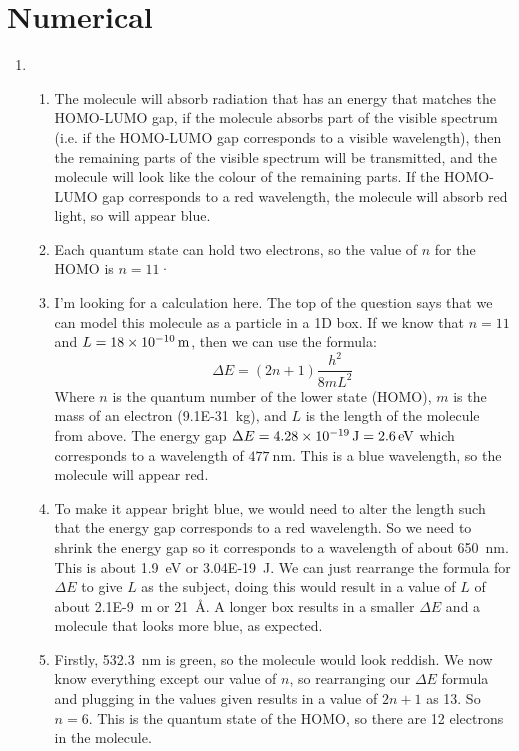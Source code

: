 \documentclass{memoir}[11pt,oneside,a4paper,openany]
\begin{document}
\section*{Numerical}
\begin{enumerate}
	\item 
		\begin{enumerate}
			\item The molecule will absorb radiation that has an energy that matches the HOMO-LUMO gap, if the molecule absorbs part of the visible spectrum (i.e. if the HOMO-LUMO gap corresponds to a visible wavelength), then the remaining parts of the visible spectrum will be transmitted, and the molecule will look like the colour of the remaining parts. If the HOMO-LUMO gap corresponds to a red wavelength, the molecule will absorb red light, so will appear blue.
			\item Each quantum state can hold two electrons, so the value of $n$ for the HOMO is $n=11$·
			\item I'm looking for a calculation here. The top of the question says that we can model this molecule as a particle in a 1D box. If we know that $n=11$ and $L=\SI{18E-10}{m}$, then we can use the formula:
				\begin{equation}
					\Delta E = (2n+1)\frac{h^2}{8mL^2}
				\end{equation}
				Where $n$ is the quantum number of the lower state (HOMO), $m$ is the mass of an electron (\SI{9.1E-31}{\kilo\gram}), and $L$ is the length of the molecule from above. The energy gap $\Delta E = \SI{4.28E-19}{\joule} = \SI{2.6}{\electronvolt}$ which corresponds to a wavelength of $\SI{477}{\nano\metre}$. This is a blue wavelength, so the molecule will appear red.
			\item To make it appear bright blue, we would need to alter the length such that the energy gap corresponds to a red wavelength. So we need to shrink the energy gap so it corresponds to a wavelength of about \SI{650}{\nano\metre}. This is about \SI{1.9}{\electronvolt} or \SI{3.04E-19}{\joule}. We can just rearrange the formula for $\Delta E$ to give $L$ as the subject, doing this would result in a value of $L$ of about \SI{2.1E-9}{\metre} or \SI{21}{\angstrom}. A longer box results in a smaller $\Delta E$ and a molecule that looks more blue, as expected. 
			\item Firstly, \SI{532.3}{\nano\metre} is green, so the molecule would look reddish. We now know everything except our value of $n$, so rearranging our $\Delta E$ formula and plugging in the values given results in a value of $2n+1$ as 13. So $n = 6$. This is the quantum state of the HOMO, so there are 12 electrons in the molecule.  		

\end{enumerate}
\end{enumerate}
\end{document}
